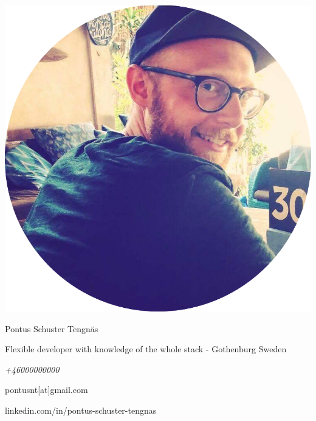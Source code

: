 \begin{minipage}{0.4\textwidth}
  \includegraphics[width=\linewidth]{../img/me.png}
\end{minipage}
\hspace{1.0cm}\begin{minipage}{0.5\textwidth}
  {\Large Pontus Schuster Tengnäs}

  Flexible developer with knowledge of the whole stack - Gothenburg Sweden
  \newline
  \newline
  {\itshape
  +46000000000

  pontusnt[at]gmail.com

  linkedin.com/in/pontus-schuster-tengnas}

\end{minipage}
